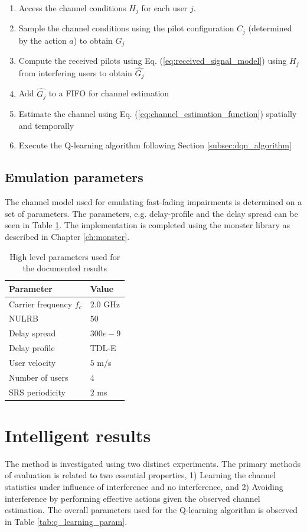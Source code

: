 \begin{enumerate}
    \item Access the channel conditions $H_j$ for each user $j$.
    \item Sample the channel conditions using the pilot configuration $C_j$ (determined by the action $a$) to obtain $G_j$
    \item Compute the received pilots using Eq. (\ref{eq:received_signal_model}) using $H_j$ from interfering users to obtain $\hat{G_j}$
    \item Add $\hat{G_j}$ to a FIFO for channel estimation
    \item Estimate the channel using Eq. (\ref{eq:channel_estimation_function}) spatially and temporally
    \item Execute the Q-learning algorithm following Section \ref{subsec:dqn_algorithm}
\end{enumerate}

\subsection{Emulation parameters}
The channel model used for emulating fast-fading impairments is determined on a set of parameters. The parameters, e.g. delay-profile and the delay spread can be seen in Table \ref{tab:sim_param}. The implementation is completed using the \gls{monster} library as described in Chapter \ref{ch:monster}. 

\begin{table}[h]
\centering
\begin{tabular}{l|l}
\toprule
\textbf{Parameter}                 & \textbf{Value} \\ \midrule
Carrier frequency $f_c$ & $2.0$ GHz \\
NULRB         & $50$             \\
Delay spread  & $300e-9$         \\
Delay profile & TDL-E          \\
User velocity & $5$ m/s \\   
Number of users & $4$ \\
SRS periodicity & $2$ ms 
\end{tabular}
\vspace{1em}
\caption{High level parameters used for the documented results}
\label{tab:sim_param}
\end{table}


\section{Intelligent results}\label{sec:RL_results}
The method is investigated using two distinct experiments. The primary methods of evaluation is related to two essential properties, 1) Learning the channel statistics under influence of interference and no interference, and 2) Avoiding interference by performing effective actions given the observed channel estimation. The overall parameters used for the Q-learning algorithm is observed in Table \ref{tab:q_learning_param}.

